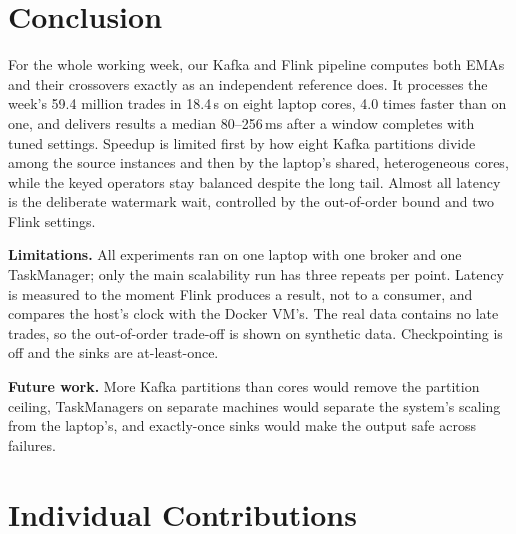 \documentclass[sigconf]{acmart}
\begin{document}
\section{Conclusion}\label{sec:concl}
For the whole working week, our Kafka and Flink pipeline computes both EMAs and their crossovers exactly as an independent reference does. It processes the week's 59.4 million trades in 18.4\,s on eight laptop cores, 4.0 times faster than on one, and delivers results a median 80--256\,ms after a window completes with tuned settings. Speedup is limited first by how eight Kafka partitions divide among the source instances and then by the laptop's shared, heterogeneous cores, while the keyed operators stay balanced despite the long tail. Almost all latency is the deliberate watermark wait, controlled by the out-of-order bound and two Flink settings.

\textbf{Limitations.} All experiments ran on one laptop with one broker and one TaskManager; only the main scalability run has three repeats per point. Latency is measured to the moment Flink produces a result, not to a consumer, and compares the host's clock with the Docker VM's. The real data contains no late trades, so the out-of-order trade-off is shown on synthetic data. Checkpointing is off and the sinks are at-least-once.

\textbf{Future work.} More Kafka partitions than cores would remove the partition ceiling, TaskManagers on separate machines would separate the system's scaling from the laptop's, and exactly-once sinks would make the output safe across failures.

\section{Individual Contributions}\label{sec:contrib}
\end{document}
